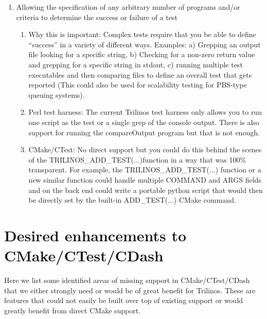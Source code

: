 \documentclass[pdf,ps2pdf,11pt]{SANDreport}
\begin{document}
\begin{enumerate}
\begin{enumerate}
  \end{enumerate}

{}\item Allowing the specification of any arbitrary number of programs
and/or criteria to determine the success or failure of a test

  \begin{enumerate}

  {}\item Why this is important: Complex tests require that you be
  able to define ``success'' in a variety of different ways.
  Examples: a) Grepping an output file looking for a specific string,
  b) Checking for a non-zero return value and grepping for a specific
  string in stdout, c) running multiple test executables and then
  comparing files to define an overall test that gets reported (This
  could also be used for scalability testing for PBS-type queuing
  systems).

  {}\item Perl test harness: The current Trilinos test harness only
  allows you to run one script as the test or a single grep of the
  console output.  There is also support for running the compareOutput
  program but that is not enough.

  {}\item CMake/CTest: No direct support but you could do this behind
  the scenes of the TRILINOS\_ADD\_TEST(...)function in a way that
  was 100\% transparent.  For example, the TRILINOS\_ADD\_TEST(...) 
  function or a new similar function could handle multiple COMMAND and
  ARGS fields and on the back end could write a portable python script
  that would then be directly set by the built-in ADD\_TEST(...) CMake
  command.

  \end{enumerate}

\end{enumerate}

%
\section{Desired enhancements to CMake/CTest/CDash}
%

Here we list some identified areas of missing support in
CMake/CTest/CDash that we either strongly need or would be of great
benefit for Trilinos.  These are features that could not easily be
built over top of existing support or would greatly benefit from
direct CMake support.
\end{document}
